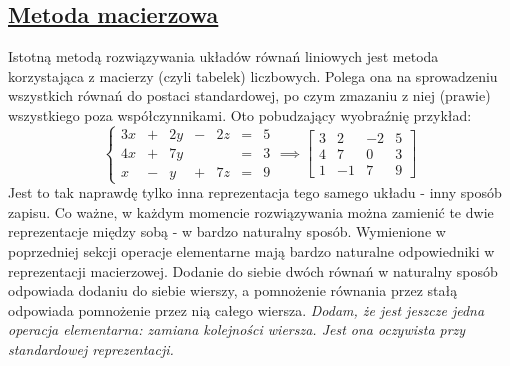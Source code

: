 \documentclass{article}
\theoremstyle{remark}
\begin{document}
\subsection{\texorpdfstring{\ul{Metoda macierzowa}}{Metoda macierzowa}}
Istotną metodą rozwiązywania układów równań liniowych jest metoda korzystająca
z macierzy (czyli tabelek) liczbowych.
Polega ona na sprowadzeniu wszystkich równań do postaci standardowej, po czym
zmazaniu z niej (prawie) wszystkiego poza współczynnikami. Oto pobudzający wyobraźnię przykład:
\[
  \left\{
    \begin{array}{lllllll}
      3x &+& 2y &-& 2z &=& 5\\
      4x &+& 7y && &=& 3\\
      x &-& y &+& 7z &=& 9
    \end{array}
  \right. \implies \left[
    \begin{array}{lll|l}
      3 & 2 &- 2 & 5\\
      4 & 7 &  0  & 3\\
      1 &- 1 & 7 & 9
    \end{array}
  \right]
\]
Jest to tak naprawdę tylko inna reprezentacja tego samego układu - inny sposób zapisu.
Co ważne, w każdym momencie rozwiązywania można zamienić te dwie reprezentacje
między sobą - w bardzo naturalny sposób. Wymienione w poprzedniej sekcji operacje elementarne 
mają bardzo naturalne odpowiedniki w reprezentacji macierzowej.
Dodanie do siebie dwóch równań w naturalny sposób odpowiada dodaniu do siebie
wierszy, a pomnożenie równania przez stałą odpowiada pomnożenie przez nią całego wiersza.
\textit{Dodam, że jest jeszcze jedna operacja elementarna: zamiana kolejności wiersza. 
Jest ona oczywista przy standardowej reprezentacji.}
\end{document}
